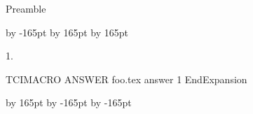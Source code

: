 Preamble


\renewcommand{\RM}{1}%
\setcounter{page}{2}%
\setlength{\columnsep}{24pt}
\advance \leftskip by -165pt
\advance\hsize by 165pt
\advance\linewidth by 165pt
\begin{multicols}{2}%


\begin{ExerciseList}

\item[\hfill 1.]

TCIMACRO
ANSWER
foo.tex answer 1
EndExpansion

\end{ExerciseList}


\end{multicols}
\advance \leftskip by 165pt
\advance\hsize by -165pt
\advance\linewidth by -165pt%




